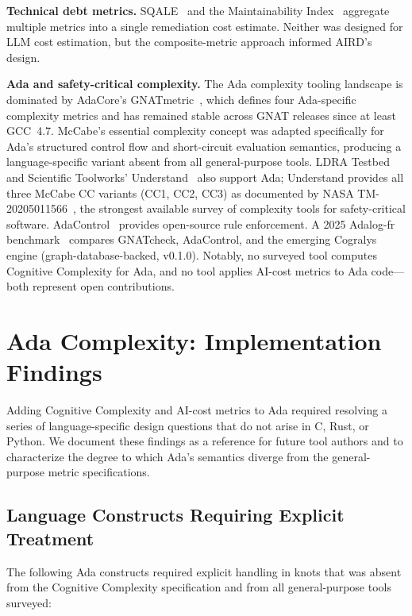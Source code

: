 \documentclass[10pt,twocolumn,letterpaper]{article}
\begin{document}
\textbf{Technical debt metrics.}
SQALE~\cite{sqale} and the Maintainability Index~\cite{mi} aggregate
multiple metrics into a single remediation cost estimate.  Neither was
designed for LLM cost estimation, but the composite-metric approach
informed AIRD's design.

\textbf{Ada and safety-critical complexity.}
The Ada complexity tooling landscape is dominated by AdaCore's
GNATmetric~\cite{gnatmetric}, which defines four Ada-specific complexity
metrics and has remained stable across GNAT releases since at least
GCC~4.7.  McCabe's essential complexity concept was adapted specifically
for Ada's structured control flow and short-circuit evaluation semantics,
producing a language-specific variant absent from all general-purpose
tools.  LDRA Testbed~\cite{ldra} and Scientific Toolworks'
Understand~\cite{understand} also support Ada; Understand provides all
three McCabe CC variants (CC1, CC2, CC3) as documented by NASA
TM-20205011566~\cite{nasa-cc-study}, the strongest available survey
of complexity tools for safety-critical software.  AdaControl~\cite{adacontrol}
provides open-source rule enforcement.  A 2025 Adalog-fr
benchmark~\cite{adalog-benchmark} compares GNATcheck, AdaControl, and
the emerging Cogralys engine (graph-database-backed, v0.1.0).  Notably,
no surveyed tool computes Cognitive Complexity for Ada, and no tool
applies AI-cost metrics to Ada code---both represent open contributions.

\section{Ada Complexity: Implementation Findings}
\label{sec:ada-findings}

Adding Cognitive Complexity and AI-cost metrics to Ada required resolving
a series of language-specific design questions that do not arise in C, Rust,
or Python.  We document these findings as a reference for future tool
authors and to characterize the degree to which Ada's semantics diverge
from the general-purpose metric specifications.

\subsection{Language Constructs Requiring Explicit Treatment}

The following Ada constructs required explicit handling in knots that
was absent from the Cognitive Complexity specification and from all
general-purpose tools surveyed:
\end{document}
